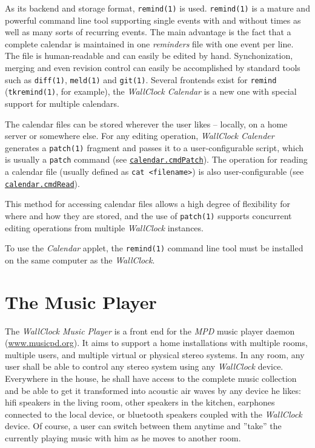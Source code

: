 \documentclass[12pt,english,parskip=half]{scrreprt}
\newcommand{\idx}[1]{#1\index{#1}}
\newcommand{\envref}[1]{\hyperref[env:#1]{\texttt{#1}}}        %
\begin{document}
As its backend and storage format, \texttt{remind(1)} is used.
\texttt{remind(1)} is a mature and powerful command line tool
supporting single events with and without times as well as
many sorts of recurring events. The main advantage is the fact that a
complete calendar is maintained in one \emph{reminders} file with one
event per line. The file is human-readable and can easily be
edited by hand. Synchonization, merging and even
revision control can easily be accomplished by standard tools such as
\texttt{diff(1)}, \texttt{meld(1)} and \texttt{git(1)}.
Several frontends exist for \texttt{remind} (\texttt{tkremind(1)}, for example),
the \emph{WallClock Calendar} is a new one with special support for multiple
calendars.

The calendar files can be stored wherever the user likes -- locally, on
a home server or somewhere else.
For any editing operation, \emph{WallClock Calender} generates a
\texttt{patch(1)} fragment and passes it to a user-configurable script, which
is usually a \texttt{patch} command (see \envref{calendar.cmdPatch}).
The operation for reading a calendar file (usually defined as \texttt{cat <filename>})
is also user-configurable (see \envref{calendar.cmdRead}).

This method for accessing calendar files allows a high degree of flexibility
for where and how they are stored, and the use of \texttt{patch(1)} supports
concurrent editing operations from multiple \emph{WallClock} instances.

To use the \emph{Calendar} applet, the \texttt{remind(1)} command
line tool must be installed on the same computer as the \emph{WallClock}.





\section{The Music Player}
\label{sec:wallclock-music}


The \emph{WallClock Music Player} is a front end for the
\emph{MPD} music player daemon (\url{www.musicpd.org}). It aims to support a home
installations with multiple rooms, multiple users, and multiple virtual or physical
stereo systems. In any room, any user shall be able to control any
stereo system using any \emph{WallClock} device. Everywhere in the house,
he shall have access to the complete music collection and be able to
get it transformed into acoustic air waves by any device he likes:
hifi speakers in the living room, other speakers in the kitchen,
earphones connected to the local device, or bluetooth speakers
coupled with the \emph{WallClock} device. Of course, a user can switch
between them anytime and ''take'' the currently playing music with him as
he moves to another room.
\end{document}

